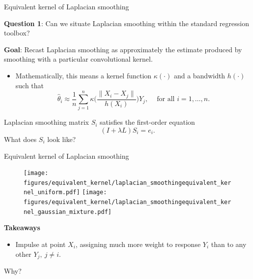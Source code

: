 \documentclass[xcolor=dvipsnames]{beamer}
\newcommand{\wh}[1]{\widehat{#1}}
\begin{document}
\begin{frame}[t]{Equivalent kernel of Laplacian smoothing}

\textbf{Question 1}: Can we situate Laplacian smoothing within the standard regression toolbox?
\pause

\textbf{Goal}: Recast Laplacian smoothing as approximately the estimate produced by smoothing with a particular convolutional kernel. \\
\vspace{.2 in}

\begin{itemize}
	\item Mathematically, this means a kernel function $\kappa(\cdot)$ and a bandwidth $h(\cdot)$ such that
	\begin{equation*}
	\wh{\theta}_i \approx \frac{1}{n} \sum_{j = 1}^{n} \kappa\biggl(\frac{\|X_i - X_j\|}{h(X_i)}\biggr) Y_j, \quad~\textrm{for all $i = 1,\ldots,n$.}
	\end{equation*}
\end{itemize}
\pause
Laplacian smoothing matrix $S_i$ satisfies the first-order equation
\begin{equation*}
(I + \lambda L)S_i = e_i.
\end{equation*}
What does $S_i$ look like?

\end{frame}

\begin{frame}[t]{Equivalent kernel of Laplacian smoothing}
\begin{figure}
	\texttt{[image: figures/equivalent\_kernel/laplacian\_smoothingequivalent\_kernel\_uniform.pdf]}
	\texttt{[image: figures/equivalent\_kernel/laplacian\_smoothingequivalent\_kernel\_gaussian\_mixture.pdf]}
\end{figure}
\pause
\textbf{Takeaways}
\begin{itemize}
	\item \alert{Impulse} at point $X_i$, assigning much more weight to response $Y_i$ than to any other $Y_j,~j \neq i$.
\end{itemize}
Why?
\end{frame}
\end{document}
